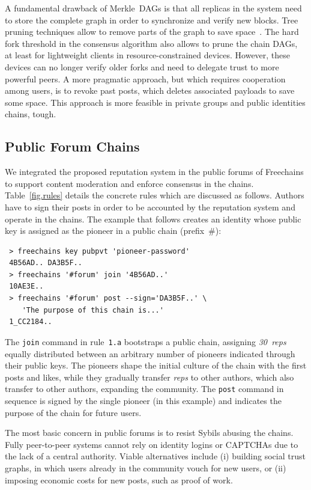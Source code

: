 \documentclass[10pt,journal,compsoc]{IEEEtran}
\newcommand{\FC}       {Freechains\xspace}
\newcommand{\reps}     {\emph{reps}\xspace}
\newcommand{\nreps}[1] {\emph{#1~reps\xspace}}
\newcommand{\code}[1]  {\texttt{\footnotesize{#1}}}
\begin{document}
A fundamental drawback of Merkle~DAGs is that all replicas in the system need
to store the complete graph in order to synchronize and verify new blocks.
Tree pruning techniques allow to remove parts of the graph to save
space~\cite{p2p.prune}.
The hard fork threshold in the consensus algorithm also allows to prune the
chain DAGs, at least for lightweight clients in resource-constrained devices.
However, these devices can no longer verify older forks and need to delegate
trust to more powerful peers.
%
A more pragmatic approach, but which requires cooperation among users, is to
revoke past posts, which deletes associated payloads to save some space.
This approach is more feasible in private groups and public identities chains,
tough.

\subsection{Public Forum Chains}
\label{sec.consensus.chains}

We integrated the proposed reputation system in the public forums of \FC to
support content moderation and enforce consensus in the chains.
Table~\ref{fig.rules} details the concrete rules which are discussed as
follows.
Authors have to sign their posts in order to be accounted by the reputation
system and operate in the chains.
The example that follows creates an identity whose public key is assigned as
the pioneer in a public chain (prefix~$\#$):

{\footnotesize
\begin{verbatim}
 > freechains key pubpvt 'pioneer-password'
 4B56AD.. DA3B5F..
 > freechains '#forum' join '4B56AD..'
 10AE3E..
 > freechains '#forum' post --sign='DA3B5F..' \
    'The purpose of this chain is...'
 1_CC2184..
\end{verbatim}
}

The \code{join} command in rule~\code{1.a} bootstraps a public chain,
assigning \nreps{30} equally distributed between an arbitrary number of
pioneers indicated through their public keys.
The pioneers shape the initial culture of the chain with the first posts and
likes, while they gradually transfer \reps to other authors, which also
transfer to other authors, expanding the community.
%
The \code{post} command in sequence is signed by the single pioneer (in this
example) and indicates the purpose of the chain for future users.

The most basic concern in public forums is to resist Sybils abusing the
chains.
Fully peer-to-peer systems cannot rely on identity logins or {\footnotesize
CAPTCHAs} due to the lack of a central authority.
Viable alternatives include (i) building social trust graphs, in which users
already in the community vouch for new users, or (ii) imposing economic costs
for new posts, such as proof of work.
\end{document}
